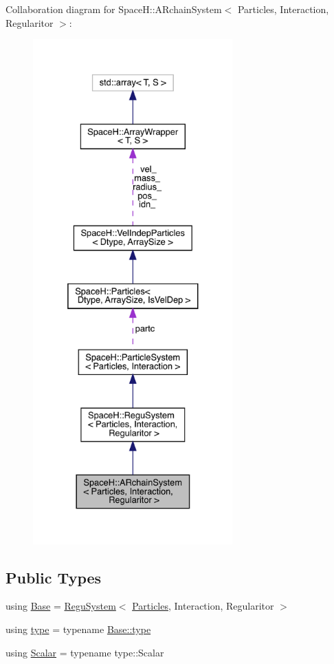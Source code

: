 Collaboration diagram for SpaceH\+:\+:A\+Rchain\+System$<$ Particles, Interaction, Regularitor $>$\+:
\nopagebreak
\begin{figure}[H]
\begin{center}
\leavevmode
\includegraphics[height=550pt]{class_space_h_1_1_a_rchain_system__coll__graph}
\end{center}
\end{figure}
\subsection*{Public Types}
\begin{DoxyCompactItemize}
\item 
using \mbox{\hyperlink{class_space_h_1_1_a_rchain_system_a406ea4f9fd417879ac32c691bb705de4}{Base}} = \mbox{\hyperlink{class_space_h_1_1_regu_system}{Regu\+System}}$<$ \mbox{\hyperlink{struct_space_h_1_1_particles}{Particles}}, Interaction, Regularitor $>$
\item 
using \mbox{\hyperlink{class_space_h_1_1_a_rchain_system_a1830232bc4647fc2ef093696d76db007}{type}} = typename \mbox{\hyperlink{class_space_h_1_1_regu_system_a21376735739dfbe668a70cdba008baa3}{Base\+::type}}
\item 
using \mbox{\hyperlink{class_space_h_1_1_a_rchain_system_acaaa03940944dd5d6978c575888dd308}{Scalar}} = typename type\+::\+Scalar
\end{DoxyCompactItemize}
